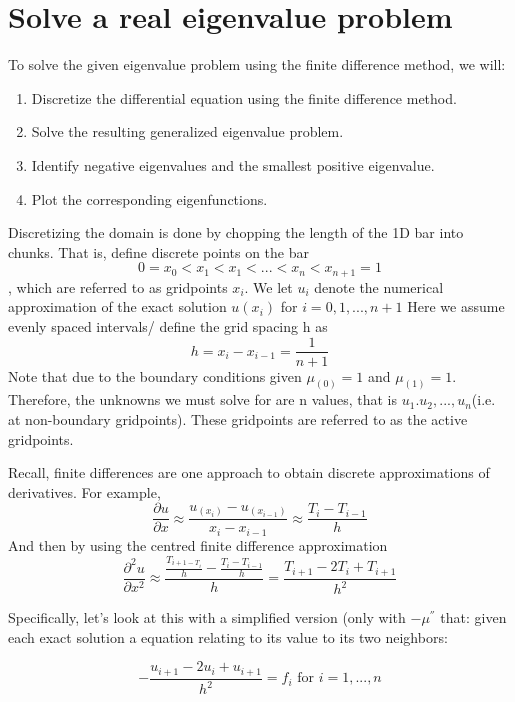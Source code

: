 \chapter{Solve a real eigenvalue problem }
\label{chapter3}

To solve the given eigenvalue problem using the finite difference method, we will:
\begin{enumerate}
    \item Discretize the differential equation using the finite difference method.
    \item Solve the resulting generalized eigenvalue problem.
    \item Identify negative eigenvalues and the smallest positive eigenvalue.
    \item Plot the corresponding eigenfunctions.
\end{enumerate}

Discretizing the domain is done by chopping the length of the 1D bar into chunks. That is, define discrete points on the bar
\[0 = x_0<x_1<x_1<...<x_n<x_{n+1} = 1\], which are referred to as gridpoints $x_i$. We let $u_i$ denote the numerical approximation of the exact solution $u(x_i)$ for $i = 0,1,...,n+1$
Here we assume evenly spaced intervals/ define the grid spacing h as
\[h = x_i - x_{i-1} = \frac{1}{n+1}\]
Note that due to the boundary conditions given $\mu_{(0)} = 1$ and $\mu_{(1)}=1$. Therefore, the unknowns we must solve for are n values, that is $u_1.u_2,...,u_n$(i.e. at non-boundary gridpoints). These gridpoints are referred to as the active gridpoints. 

Recall, finite differences are one approach to obtain discrete approximations of derivatives. For example,
\[\frac{\partial u}{\partial x} \approx \frac{u_{(x_i)}-u_{(x_{i-1})}}{x_i-x_{i-1}} \approx \frac{T_i - T_{i-1}}{h}\] 
And then by using the centred finite difference approximation
\[\frac{\partial^2 u}{\partial x^2} \approx \frac{\frac{T_{i+1-T_i}}{h}-\frac{T_i-T_{i-1}}{h}}{h}=\frac{T_{i+1}-2T_i+T_{i+1}}{h^2}\]

Specifically, let's look at this with a simplified version (only with $-\mu^{''}$ that: given each exact solution a equation relating to its value to its two neighbors:

\begin{equation}
    -\frac{u_{i+1}-2u_i+u_{i+1}}{h^2} = f_i \text{ for } i = 1,...,n
\end{equation}

